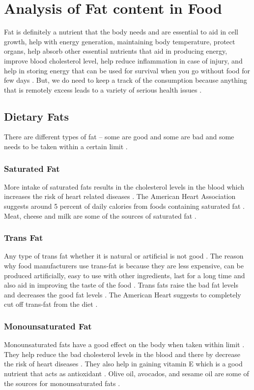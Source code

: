 \documentclass[sigconf]{acmart}
\begin{document}
\section{Analysis of Fat content in Food}
Fat is definitely a nutrient that the body needs and are essential to aid in cell growth, help with energy generation, maintaining body temperature, protect organs, help absorb other essential nutrients that aid in producing energy, improve blood cholesterol level, help reduce inflammation in case of injury, and help in storing energy that can be used for survival when you go without food for few days \cite{www-health}. But, we do need to keep a track of the consumption because anything that is remotely excess leads to a variety of serious health issues \cite{www-health}.  

\subsection{Dietary Fats}
There are different types of fat – some are good and some are bad and some needs to be taken within a certain limit \cite{www-health}. 

\subsubsection{Saturated Fat}
More intake of saturated fats results in the cholesterol levels in the blood which increases the risk of heart related diseases \cite{www-health}. The American Heart Association suggests around 5 percent of daily calories from foods containing saturated fat \cite{www-health}. Meat, cheese and milk are some of the sources of saturated fat \cite{www-health}. 

\subsubsection{Trans Fat}
Any type of trans fat whether it is natural or artificial is not good \cite{www-health}. The reason why food manufacturers use trans-fat is because they are less expensive, can be produced artificially, easy to use with other ingredients, last for a long time and also aid in improving the taste of the food \cite{www-health}. Trans fats raise the bad fat levels and decreases the good fat levels \cite{www-health}. The American Heart suggests to completely cut off trans-fat from the diet \cite{www-health}.

\subsubsection{Monounsaturated Fat}
Monounsaturated fats have a good effect on the body when taken within limit \cite{www-health}. They help reduce the bad cholesterol levels in the blood and there by decrease the risk of heart diseases \cite{www-health}. They also help in gaining vitamin E which is a good nutrient that acts as antioxidant \cite{www-health}. Olive oil, avocados, and sesame oil are some of the sources for monounsaturated fats \cite{www-health}.
\end{document}
